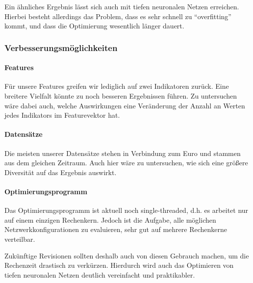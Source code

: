 Ein ähnliches Ergebnis lässt sich auch mit tiefen neuronalen Netzen erreichen. Hierbei besteht allerdings das Problem, dass es sehr schnell zu \enquote{overfitting} kommt, und dass die Optimierung wesentlich länger dauert.

\subsubsection{Verbesserungsmöglichkeiten}
\author{Dennis Kempf}
\label{ssec:Verbesserungsmöglichkeiten}

\paragraph{Features}
Für unsere Features greifen wir lediglich auf zwei Indikatoren zurück. Eine breitere Vielfalt könnte zu noch besseren Ergebnissen führen. Zu untersuchen wäre dabei auch, welche Auswirkungen eine Veränderung der Anzahl an Werten jedes Indikators im Featurevektor hat.

\paragraph{Datensätze}
Die meisten unserer Datensätze stehen in Verbindung zum Euro und stammen aus dem gleichen Zeitraum. Auch hier wäre zu untersuchen, wie sich eine größere Diversität auf das Ergebnis auswirkt.

\paragraph{Optimierungsprogramm}
Das Optimierungsprogramm ist aktuell noch single-threaded, d.h. es arbeitet nur auf einem einzigen Rechenkern. Jedoch ist die Aufgabe, alle möglichen Netzwerkkonfigurationen zu evaluieren, sehr gut auf mehrere Rechenkerne verteilbar. 

Zukünftige Revisionen sollten deshalb auch von diesen Gebrauch machen, um die Rechenzeit drastisch zu verkürzen. Hierdurch wird auch das Optimieren von tiefen neuronalen Netzen deutlich vereinfacht und praktikabler.


